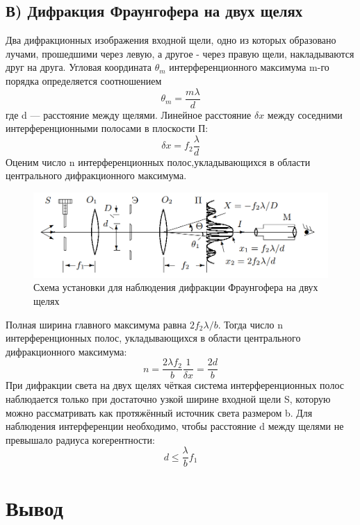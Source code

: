 \subsection*{В) Дифракция Фраунгофера на двух щелях}
\indent
Два дифракционных изображения входной щели, одно из которых образовано лучами, прошедшими через левую, а другое - через правую щели, накладываются друг на друга.
Угловая координата $\theta_m$ интерференционного максимума m-го порядка определяется соотношением
\begin{equation}
    \theta_m = \frac{m\lambda}{d}
\end{equation}
где d — расстояние между щелями. Линейное расстояние $\delta x$ между соседними интерференционными полосами в плоскости П:
\begin{equation}
    \delta x = f_2\frac{\lambda}{d}
\end{equation}
Оценим число n интерференционных полос,укладывающихся в области центрального дифракционного максимума.
\newpage
\begin{figure}
    \centering
    \includegraphics[width=14cm]{images/fraungofer_3.png}
    \caption{Схема установки для наблюдения дифракции Фраунгофера на двух щелях}
\end{figure}

Полная ширина главного максимума равна $2f_2\lambda / b$. Тогда число n интерференционных полос,
укладывающихся в области центрального дифракционного максимума:
\begin{equation}
    n =\frac{2\lambda f_2}{b}\frac{1}{\delta x} = \frac{2d}{b}
\end{equation}
\indent
При дифракции света на двух щелях чёткая система интерференционных полос наблюдается только при достаточно узкой ширине входной щели S, которую можно рассматривать как протяжённый источник света размером b. Для наблюдения интерференции необходимо, чтобы
расстояние d между щелями не превышало радиуса когерентности:
\begin{equation}
    d \le \frac{\lambda}{b}f_1
\end{equation}
\section*{Вывод}
